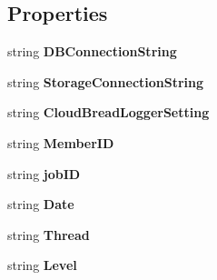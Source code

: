 \subsection*{Properties}
\begin{DoxyCompactItemize}
\item 
string {\bfseries D\+B\+Connection\+String}\hypertarget{a00026_a430054db22907c2f378335b031053a9b}{}\label{a00026_a430054db22907c2f378335b031053a9b}

\item 
string {\bfseries Storage\+Connection\+String}\hypertarget{a00026_a93feee8e4888958078a0f2231d2deac0}{}\label{a00026_a93feee8e4888958078a0f2231d2deac0}

\item 
string {\bfseries Cloud\+Bread\+Logger\+Setting}\hypertarget{a00026_ada1533edbb0992304801d639c327118b}{}\label{a00026_ada1533edbb0992304801d639c327118b}

\item 
string {\bfseries Member\+ID}\hypertarget{a00026_a8eec96d06d55a74e21f23a0cbde3cca4}{}\label{a00026_a8eec96d06d55a74e21f23a0cbde3cca4}

\item 
string {\bfseries job\+ID}\hypertarget{a00026_a8ece2c804360064b26504c2d1780f8c9}{}\label{a00026_a8ece2c804360064b26504c2d1780f8c9}

\item 
string {\bfseries Date}\hypertarget{a00026_a4a35cf61f3924278155caf1e80277336}{}\label{a00026_a4a35cf61f3924278155caf1e80277336}

\item 
string {\bfseries Thread}\hypertarget{a00026_af7db60deee306708cd86edb69acbc86c}{}\label{a00026_af7db60deee306708cd86edb69acbc86c}

\item 
string {\bfseries Level}\hypertarget{a00026_a3cf1d50a949962f3833142a52cacdd31}{}\label{a00026_a3cf1d50a949962f3833142a52cacdd31}


\end{DoxyCompactItemize}
